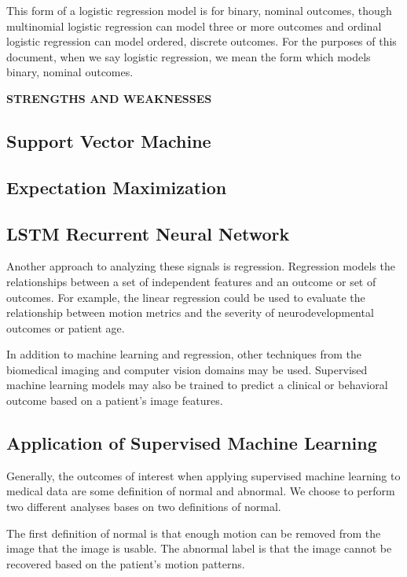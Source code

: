 This form of a logistic regression model is for binary, nominal outcomes, though multinomial logistic regression can model three or more outcomes and ordinal logistic regression can model ordered, discrete outcomes. For the purposes of this document, when we say logistic regression, we mean the form which models binary, nominal outcomes. 

\textbf{STRENGTHS AND WEAKNESSES} 

\subsection{Support Vector Machine}

\subsection{Expectation Maximization}

\subsection{LSTM Recurrent Neural Network}

Another approach to analyzing these signals is regression. Regression models the relationships between a set of independent features and an outcome or set of outcomes. For example, the linear regression could be used to evaluate the relationship between motion metrics and the severity of neurodevelopmental outcomes or patient age. 

In addition to machine learning and regression, other techniques from the biomedical imaging and computer vision domains may be used. Supervised machine learning models may also be trained to predict a clinical or behavioral outcome based on a patient's image features.

\subsection{Application of Supervised Machine Learning}

Generally, the outcomes of interest when applying supervised machine learning to medical data are some definition of normal and abnormal. We choose to perform two different analyses bases on two definitions of normal. 

The first definition of normal is that enough motion can be removed from the image that the image is usable. The abnormal label is that the image cannot be recovered based on the patient's motion patterns.

